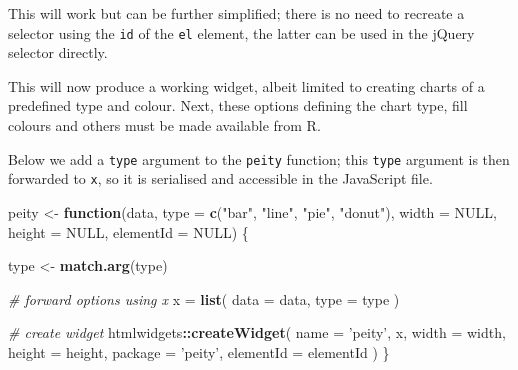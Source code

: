 \documentclass[10pt,]{krantz}
\makeatletter
\newenvironment{Shaded}{\begin{snugshade}}{\end{snugshade}}
\newcommand{\AttributeTok}[1]{\textcolor[rgb]{0.61,0.61,0.61}{#1}}
\newcommand{\CommentTok}[1]{\textcolor[rgb]{0.37,0.37,0.37}{\textit{#1}}}
\newcommand{\ControlFlowTok}[1]{\textcolor[rgb]{0.27,0.27,0.27}{\textbf{#1}}}
\newcommand{\DataTypeTok}[1]{\textcolor[rgb]{0.27,0.27,0.27}{#1}}
\newcommand{\KeywordTok}[1]{\textcolor[rgb]{0.27,0.27,0.27}{\textbf{#1}}}
\newcommand{\NormalTok}[1]{#1}
\newcommand{\OperatorTok}[1]{\textcolor[rgb]{0.43,0.43,0.43}{\textbf{#1}}}
\newcommand{\OtherTok}[1]{\textcolor[rgb]{0.37,0.37,0.37}{#1}}
\newcommand{\StringTok}[1]{\textcolor[rgb]{0.5,0.5,0.5}{#1}}
\newenvironment{kframe}{%
\medskip{}
\setlength{\fboxsep}{.8em}
 \def\at@end@of@kframe{}%
 \ifinner\ifhmode%
  \def\at@end@of@kframe{\end{minipage}}%
  \begin{minipage}{\columnwidth}%
 \fi\fi%
 \def\FrameCommand##1{\hskip\@totalleftmargin \hskip-\fboxsep
 \colorbox{shadecolor}{##1}\hskip-\fboxsep
     \hskip-\linewidth \hskip-\@totalleftmargin \hskip\columnwidth}%
 \MakeFramed {\advance\hsize-\width
   \@totalleftmargin\z@ \linewidth\hsize
   \@setminipage}}%
 {\par\unskip\endMakeFramed%
 \at@end@of@kframe}
\renewenvironment{Shaded}{\begin{kframe}}{\end{kframe}}
\makeatother
\begin{document}
This will work but can be further simplified; there is no need to recreate a selector using the \texttt{id} of the \texttt{el} element, the latter can be used in the jQuery selector directly.

\begin{Shaded}
\end{Shaded}

This will now produce a working widget, albeit limited to creating charts of a predefined type and colour. Next, these options defining the chart type, fill colours and others must be made available from R.

Below we add a \texttt{type} argument to the \texttt{peity} function; this \texttt{type} argument is then forwarded to \texttt{x}, so it is serialised and accessible in the JavaScript file.

\begin{Shaded}
\begin{Highlighting}[]
\NormalTok{peity <-}\StringTok{ }\ControlFlowTok{function}\NormalTok{(data, }\DataTypeTok{type =} \KeywordTok{c}\NormalTok{(}\StringTok{"bar"}\NormalTok{, }\StringTok{"line"}\NormalTok{, }\StringTok{"pie"}\NormalTok{, }\StringTok{"donut"}\NormalTok{), }
  \DataTypeTok{width =} \OtherTok{NULL}\NormalTok{, }\DataTypeTok{height =} \OtherTok{NULL}\NormalTok{, }\DataTypeTok{elementId =} \OtherTok{NULL}\NormalTok{) \{}

\NormalTok{  type <-}\StringTok{ }\KeywordTok{match.arg}\NormalTok{(type)}

  \CommentTok{# forward options using x}
\NormalTok{  x =}\StringTok{ }\KeywordTok{list}\NormalTok{(}
    \DataTypeTok{data =}\NormalTok{ data,}
    \DataTypeTok{type =}\NormalTok{ type}
\NormalTok{  )}

  \CommentTok{# create widget}
\NormalTok{  htmlwidgets}\OperatorTok{::}\KeywordTok{createWidget}\NormalTok{(}
    \DataTypeTok{name =} \StringTok{'peity'}\NormalTok{,}
\NormalTok{    x,}
    \DataTypeTok{width =}\NormalTok{ width,}
    \DataTypeTok{height =}\NormalTok{ height,}
    \DataTypeTok{package =} \StringTok{'peity'}\NormalTok{,}
    \DataTypeTok{elementId =}\NormalTok{ elementId}
\NormalTok{  )}
\NormalTok{\}}
\end{Highlighting}
\end{Shaded}
\end{document}
